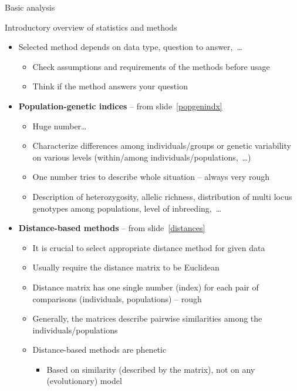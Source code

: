 \documentclass[compress, ucs, xelatex, 11pt, xcolor=svgnames,
  hyperref={
    bookmarks=true,
    unicode=true,
    colorlinks=true,
    pdftitle={Molecular data in R},
    plainpages=false,
    pdfauthor={Vojtech Zeisek},
    pdfsubject={Course about phylogeny and evolution in R},
    pdfcreator={XeLaTeX},
    pdfkeywords={R, evolution, phylogeny, molecular data},
    linkcolor=Tomato,
    anchorcolor=SaddleBrown,
    citecolor=Goldenrod,
    filecolor=DarkMagenta,
    menucolor=Sienna,
    urlcolor=DarkTurquoise,
    pdftex},
  url={hyphens, lowtilde} %
  ]{beamer}
\begin{document}
\begin{frame}{Basic analysis}
  \tableofcontents[currentsection, sectionstyle=show/hide, hideothersubsections]
\end{frame}

\begin{frame}[allowframebreaks]{Introductory overview of statistics and methods}
  \begin{itemize}
    \item \alert{Selected method depends on data type, question to answer,~\ldots}
    \begin{itemize}
      \item Check assumptions and requirements of the methods before usage
      \item Think if the method answers your question
    \end{itemize}
    \item \textbf{Population-genetic indices} -- from slide~\ref{popgenindx}
    \begin{itemize}
      \item Huge number\ldots
      \item Characterize differences among individuals/groups or genetic variability on various levels (within/among individuals/populations,~\ldots)
      \item One number tries to describe whole situation -- always very rough
      \item Description of heterozygosity, allelic richness, distribution of multi locus genotypes among populations, level of inbreeding,~\ldots
    \end{itemize}
    \item \textbf{Distance-based methods} -- from slide~\ref{distances}
    \begin{itemize}
      \item \alert{It is crucial to select appropriate distance method for given data}
      \item Usually require the distance matrix to be Euclidean
      \item Distance matrix has one single number (index) for each pair of comparisons (individuals, populations) -- rough
      \item Generally, the matrices describe pairwise similarities among the individuals/populations
      \item Distance-based methods are phenetic
      \begin{itemize}
	\item Based on similarity (described by the matrix), not on any (evolutionary) model

\end{itemize}
\end{itemize}
\end{itemize}
\end{frame}
\end{document}
